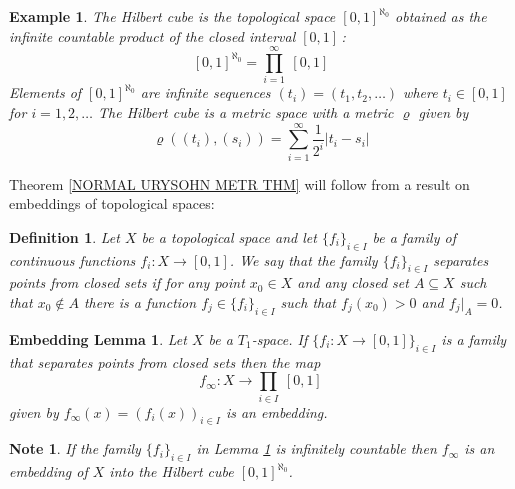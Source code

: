 \documentclass[11pt, letterpaper, oneside]{report}
\theoremstyle{pplain}
\newtheorem{ITERMVALUE THM}[theorem]{Intermediate Value Theorem}
\newtheorem{HEINEBOREL THM}[theorem]{Heine-Borel Theorem}
\newtheorem{UMETR THM}[theorem]{Urysohn Metrization Theorem}
\newtheorem{UMETR2 THM}[theorem]{Urysohn Metrization Theorem (v.2)}
\newtheorem{EMBEDDINGL}[theorem]{Embedding Lemma}
\theoremstyle{ddefinition}
\newtheorem{definition}[theorem]{Definition}
\newtheorem{example}[theorem]{Example}
\newtheorem{note}[theorem]{Note}
\theoremstyle{nnn}
\newtheorem{TDA NN}[theorem]{Topological Data Analysis. }
\theoremstyle{eexercise}
\begin{document}
\begin{example}
\label{HILBERT CUBE EX}
The \emph{Hilbert cube} is the topological space $[0, 1]^{\aleph_{0}}$  obtained as 
the infinite countable  product of the closed interval $[0, 1]\,$:
$$[0, 1]^{\aleph_{0}} = \prod_{i=1}^{\infty}\ [0, 1]$$
Elements of $[0, 1]^{\aleph_{0}}$ are infinite sequences $(t_{i}) = (t_{1}, t_{2}, \dots)$
where $t_{i}\in [0, 1]$ for $i=1, 2, \dots$ 
The Hilbert cube is a metric space with a metric $\varrho$ given by 
$$\varrho((t_{i}), (s_{i})) = \sum_{i=1}^{\infty} \frac{1}{2^{i}}|t_{i}-s_{i}|$$
\end{example}


Theorem \ref{NORMAL URYSOHN METR THM} will follow from a result 
on embeddings of topological spaces: 


\begin{definition}
\label{SEP PTCLO FAMILY DEF}
Let $X$ be a topological space and let $\{f_{i}\}_{i\in I}$ be a family of continuous 
functions $f_{i}\colon X \to [0, 1]$. We say that the family $\{f_{i}\}_{i\in I}$ 
\emph{separates points from closed sets} if for any point $x_{0}\in X$ and any closed set 
$A\subseteq X$ such that $x_{0}\not\in A$ there is a function $f_{j}\in \{f_{i}\}_{i\in I}$
such that $f_{j}(x_{0}) > 0$ and $f_{j}|_{A} = 0$.    
\end{definition}


\begin{EMBEDDINGL}
\label{EMBEDDING LEMMA}
Let $X$ be a $T_{1}$-space. If  $\{f_{i}\colon X \to [0, 1]\}_{i\in I}$ is a family 
that separates points from closed sets then the map 
$$f_{\infty}\colon X \to \prod_{i\in I} \ [0, 1]$$
given by $f_{\infty}(x) = (f_{i}(x))_{i\in I}$ is an embedding. 
\end{EMBEDDINGL}


\begin{note}
If the family $\{f_{i}\}_{i\in I}$ in Lemma \ref{EMBEDDING LEMMA} is infinitely 
countable then $f_{\infty}$ is an embedding of $X$ into the Hilbert cube $[0, 1]^{\aleph_{0}}$.
\end{note}
\end{document}
